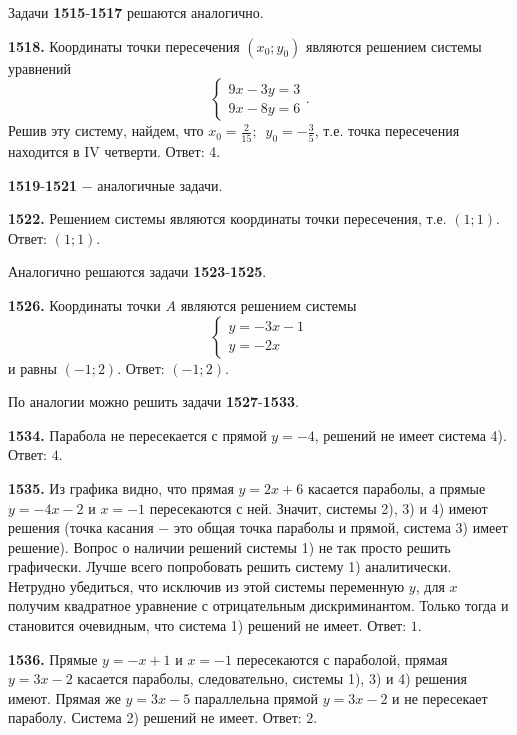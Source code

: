 Задачи \textbf{1515}-\textbf{1517} решаются аналогично. 

\textbf{1518.} Координаты точки пересечения $(x_0;y_0)$ являются решением системы уравнений $$
			\begin{cases}
				9x-3y=3
				\\
				9x-8y=6
			\end{cases}
		  .$$
Решив эту систему, найдем, что $x_0=\frac{2}{15};\enspace y_0=-\frac{3}{5}$, т.е. точка пересечения находится в  IV четверти.          Ответ: 4.

\textbf{1519}-\textbf{1521} $-$ аналогичные задачи.

\textbf{1522.} Решением системы являются координаты точки пересечения, т.е. $(1;1)$. \newline \null \hspace*{\fill} Ответ: $(1;1)$.

Аналогично решаются задачи  \textbf{1523}-\textbf{1525}.

\textbf{1526.} Координаты точки $A$ являются решением системы $$\begin{cases}
	y=-3x-1
	\\
	y=-2x	
\end{cases}$$  и равны $(-1;2)$. \newline \null \hspace*{\fill} Ответ: $(-1;2)$. 

По аналогии можно решить задачи  \textbf{1527}-\textbf{1533}.

\textbf{1534.}  Парабола не пересекается с прямой $y=-4$, решений не имеет система 4). \newline \null \hspace*{\fill} Ответ: $4$.

\textbf{1535.}  Из графика видно, что прямая $y=2x+6$ касается параболы, а прямые $y=-4x-2$ и $x=-1$ пересекаются с ней. Значит, системы 2), 3) и 4) имеют решения (точка касания $-$ это общая точка параболы и прямой, система 3) имеет решение). Вопрос о наличии решений системы 1) не так просто решить графически. Лучше всего попробовать решить систему 1) аналитически. Нетрудно убедиться, что исключив из этой системы переменную $y$, для $x$ получим квадратное уравнение с отрицательным дискриминантом. Только тогда и становится очевидным, что система 1) решений не имеет. \newline \null \hspace*{\fill} Ответ: $1$. 

\textbf{1536.} Прямые $y=-x+1$ и $x=-1$ пересекаются с параболой, прямая $y=3x-2$ касается параболы, следовательно, системы 1), 3) и 4) решения имеют. Прямая же $y=3x-5$ параллельна прямой $y=3x-2$ и не пересекает параболу.  Система 2) решений не имеет. \newline \null \hspace*{\fill} Ответ: $2$.

